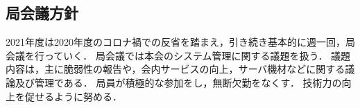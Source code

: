 \subsection*{局会議方針}

2021年度は2020年度のコロナ禍での反省を踏まえ，引き続き基本的に週一回，局会議を行っていく．
局会議では本会のシステム管理に関する議題を扱う．
議題内容は，主に脆弱性の報告や，会内サービスの向上，サーバ機材などに関する議論及び管理である．
局員が積極的な参加をし，無断欠勤をなくす．
技術力の向上を促せるように努める．

